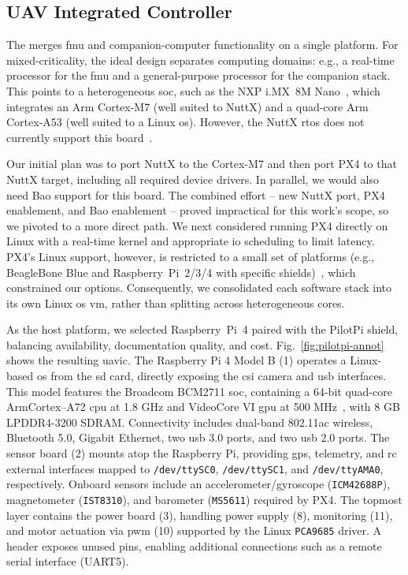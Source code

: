 \subsection{UAV Integrated Controller}
\label{sec:uav-integr-contr}
The  merges \gls{fmu} and companion-computer functionality on
a single platform. For mixed-criticality, the ideal design separates computing
domains: e.g., a real-time processor for the \gls{fmu} and a general-purpose
processor for the companion stack. This points to a heterogeneous \gls{soc},
such as the NXP i.MX~8M Nano~\cite{imx8mn}, which integrates an Arm Cortex-M7
(well suited to NuttX) and a quad-core Arm Cortex-A53 (well suited to a Linux
\gls{os}). However, the NuttX \gls{rtos} does not currently support this board~\cite{nuttx-platforms}.

Our initial plan was to port NuttX to the Cortex-M7 and then port PX4 to that
NuttX target, including all required device drivers. In parallel, we would also
need Bao support for this board. The combined effort -- new NuttX port, PX4
enablement, and Bao enablement -- proved impractical for this work's scope, so
we pivoted to a more direct path.
%
We next considered running PX4 directly on Linux with a real-time kernel and
appropriate \gls{io} scheduling to limit latency. PX4’s Linux support, however,
is restricted to a small set of platforms (e.g., BeagleBone Blue and
Raspberry~Pi~2/3/4 with specific shields)~\cite{px4-experimental-autopilot},
which constrained our options.
%
Consequently, we consolidated each software stack into its own Linux \gls{os}
\gls{vm}, rather than splitting across heterogeneous cores.

As the host
platform, we selected Raspberry~Pi~4 paired with the PilotPi shield, balancing
availability, documentation quality, and cost. Fig.~\ref{fig:pilotpi-annot}
shows the resulting \gls{uavic}.
%
The Raspberry Pi 4 Model B (1) operates a Linux-based \gls{os}
from the \gls{sd} card, directly exposing the \gls{csi} camera and
\gls{usb} interfaces. This model features the Broadcom BCM2711
\gls{soc}, containing a 64-bit quad-core Arm\textreg Cortex\textreg--A72 \gls{cpu} at
1.8 GHz and VideoCore VI \gls{gpu} at 500 MHz~\cite{rpi4-specs,rpi4-bcm2711},
with 8 GB LPDDR4-3200 SDRAM. Connectivity includes dual-band 802.11ac wireless,
Bluetooth 5.0, Gigabit Ethernet, two \gls{usb} 3.0 ports, and two \gls{usb} 2.0 ports.
%
The sensor board (2) mounts atop the Raspberry Pi,
providing \gls{gps}, telemetry, and \gls{rc} external interfaces mapped to
\lstinline{/dev/ttySC0}, \lstinline{/dev/ttySC1}, and \lstinline{/dev/ttyAMA0},
respectively. Onboard sensors include an accelerometer/gyroscope
(\lstinline{ICM42688P}), magnetometer (\lstinline{IST8310}), and barometer
(\lstinline{MS5611}) required by PX4.
%
The topmost layer contains the power board (3), handling power supply (8),
monitoring (11), and motor actuation via \gls{pwm} (10) supported by the Linux
\lstinline{PCA9685} driver. A header exposes unused pins, enabling additional
connections such as a remote serial interface (UART5).

